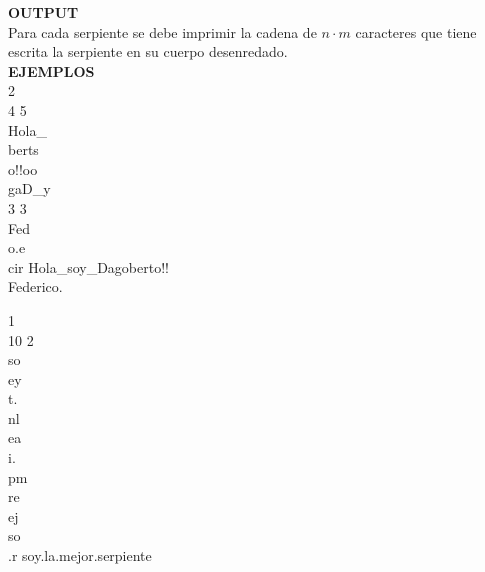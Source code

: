 \textbf{OUTPUT}\\
Para cada serpiente se debe imprimir la cadena de $n \cdot m$ caracteres que tiene escrita la serpiente en su cuerpo desenredado.\\

\textbf{EJEMPLOS}\\
\sampleBoxes
{2\\
	4 5\\
	Hola\_\\
	berts\\
	o!!oo\\
	gaD\_y\\
	3 3\\
	Fed\\
	o.e\\
	cir
}
{Hola\_soy\_Dagoberto!!\\
	Federico.
}

\sampleBoxes
{1\\
	10 2\\
	so\\
	ey\\
	t.\\
	nl\\
	ea\\
	i.\\
	pm\\
	re\\
	ej\\
	so\\
	.r
}
{soy.la.mejor.serpiente}

\pagebreak
